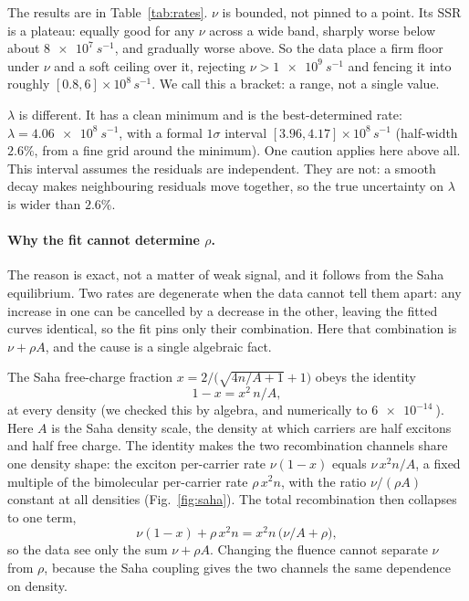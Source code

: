 \documentclass[11pt]{article}
\begin{document}
The results are in Table~\ref{tab:rates}. $\nu$ is bounded, not pinned to a
point. Its SSR is a plateau: equally good for any $\nu$ across a wide band,
sharply worse below about $\SI{8e7}{s^{-1}}$, and gradually worse above. So the
data place a firm floor under $\nu$ and a soft ceiling over it, rejecting
$\nu > \SI{1e9}{s^{-1}}$ and fencing it into roughly
$[0.8,6]\times10^{8}\,\si{s^{-1}}$. We call this a bracket: a range, not a single
value.

$\lambda$ is different. It has a clean minimum and is the best-determined rate:
$\lambda = \SI{4.06e8}{s^{-1}}$, with a formal $1\sigma$ interval
$[3.96, 4.17]\times10^{8}\,\si{s^{-1}}$ (half-width $2.6\%$, from a fine grid
around the minimum). One caution applies here above all. This interval assumes
the residuals are independent. They are not: a smooth decay makes neighbouring
residuals move together, so the true uncertainty on $\lambda$ is wider than
$2.6\%$.

\paragraph{Why the fit cannot determine $\rho$.}
The reason is exact, not a matter of weak signal, and it follows from the Saha
equilibrium. Two rates are degenerate when the data cannot tell them apart: any
increase in one can be cancelled by a decrease in the other, leaving the fitted
curves identical, so the fit pins only their combination. Here that combination
is $\nu + \rho A$, and the cause is a single algebraic fact.

The Saha free-charge fraction $x = 2/\!\big(\sqrt{4n/A + 1} + 1\big)$ obeys the
identity
\begin{equation}
1 - x = x^{2}\,n/A ,
\label{eq:saha}
\end{equation}
at every density (we checked this by algebra, and numerically to $\SI{6e-14}{}$).
Here $A$ is the Saha density scale, the density at which carriers are half
excitons and half free charge. The identity makes the two recombination channels
share one density shape: the exciton per-carrier rate $\nu(1-x)$ equals
$\nu\,x^{2}n/A$, a fixed multiple of the bimolecular per-carrier rate
$\rho\,x^{2}n$, with the ratio $\nu/(\rho A)$ constant at all densities
(Fig.~\ref{fig:saha}). The total recombination then collapses to one term,
\begin{equation}
\nu(1-x) + \rho\,x^{2}n = x^{2}n\,\big(\nu/A + \rho\big),
\end{equation}
so the data see only the sum $\nu + \rho A$. Changing the fluence cannot separate
$\nu$ from $\rho$, because the Saha coupling gives the two channels the same
dependence on density.
\end{document}
